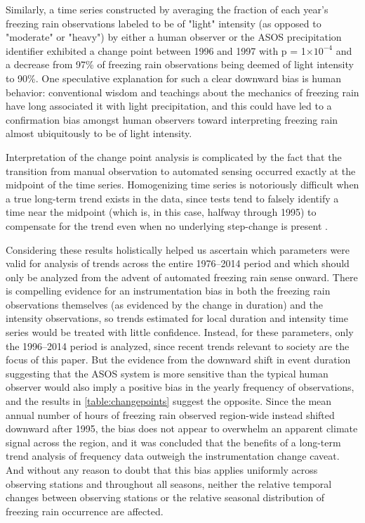 \documentclass[twocol]{ametsoc}
\begin{document}
Similarly, a time series constructed by averaging the fraction of each year's freezing rain observations labeled to be of "light" intensity (as opposed to "moderate" or "heavy") by either a human observer or the ASOS precipitation identifier exhibited a change point between 1996 and 1997 with p = 1$\times 10^{-4}$ and a decrease from 97\% of freezing rain observations being deemed of light intensity to 90\%. One speculative explanation for such a clear downward bias is human behavior: conventional wisdom and teachings about the mechanics of freezing rain have long associated it with light precipitation, and this could have led to a confirmation bias amongst human observers toward interpreting freezing rain almost ubiquitously to be of light intensity.

Interpretation of the change point analysis is complicated by the fact that the transition from manual observation to automated sensing occurred exactly at the midpoint of the time series. Homogenizing time series is notoriously difficult when a true long-term trend exists in the data, since tests tend to falsely identify a time near the midpoint (which is, in this case, halfway through 1995) to compensate for the trend even when no underlying step-change is present \citep{gallagher2013changepoint}. 

Considering these results holistically helped us ascertain which parameters were valid for analysis of trends across the entire 1976--2014 period and which should only be analyzed from the advent of automated freezing rain sense onward. There is compelling evidence for an instrumentation bias in both the freezing rain observations themselves (as evidenced by the change in duration) and the intensity observations, so trends estimated for local duration and intensity time series would be treated with little confidence. Instead, for these parameters, only the 1996--2014 period is analyzed, since recent trends relevant to society are the focus of this paper. But the evidence from the downward shift in event duration suggesting that the ASOS system is more sensitive than the typical human observer would also imply a positive bias in the yearly frequency of observations, and the results in \ref{table:changepoints} suggest the opposite. Since the mean annual number of hours of freezing rain observed region-wide instead shifted downward after 1995, the bias does not appear to overwhelm an apparent climate signal across the region, and it was concluded that the benefits of a long-term trend analysis of frequency data outweigh the instrumentation change caveat. And without any reason to doubt that this bias applies uniformly across observing stations and throughout all seasons, neither the relative temporal changes between observing stations or the relative seasonal distribution of freezing rain occurrence are affected.
\end{document}
